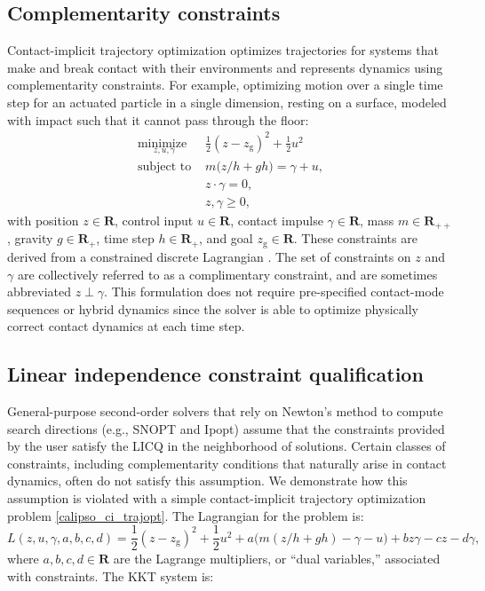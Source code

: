 \subsection{Complementarity constraints}
Contact-implicit trajectory optimization \cite{posa2014direct} optimizes trajectories for systems that make and break contact with their environments and represents dynamics using complementarity constraints. For example, optimizing motion over a single time step for an actuated particle in a single dimension, resting on a surface, modeled with impact such that it cannot pass through the floor:
\begin{equation}
	\begin{array}{ll}
		\underset{z, u, \gamma}{\mbox{minimize }} & \frac{1}{2}(z - z_{\mbox{g}})^2 + \frac{1}{2}u^2 \\
		\mbox{subject to } & m \big(z / h + g h \big) = \gamma + u, \\
		& z \cdot \gamma = 0, \\
		& z, \gamma \geq 0,
	\end{array} \label{calipso_ci_trajopt}
\end{equation}
with position $z\in \mathbf{R}$, control input $u \in \mathbf{R}$, contact impulse $\gamma \in \mathbf{R}$, mass $m \in \mathbf{R}_{++}$, gravity $g \in \mathbf{R}_{+}$, time step $h \in \mathbf{R}_+$, and goal $z_{\mbox{g}} \in \mathbf{R}$. These constraints are derived from a constrained discrete Lagrangian \cite{manchester2020variational}. The set of constraints on $z$ and $\gamma$ are collectively referred to as a complimentary constraint, and are sometimes abbreviated $z \perp \gamma$. This formulation does not require pre-specified contact-mode sequences or hybrid dynamics since the solver is able to optimize physically correct contact dynamics at each time step.

\subsection{Linear independence constraint qualification}
General-purpose second-order solvers that rely on Newton's method to compute search directions (e.g., SNOPT and Ipopt) assume that the constraints provided by the user satisfy the LICQ in the neighborhood of solutions. Certain classes of constraints, including complementarity conditions that naturally arise in contact dynamics, often do not satisfy this assumption. 
We demonstrate how this assumption is violated with a simple contact-implicit trajectory optimization problem \eqref{calipso_ci_trajopt}. The Lagrangian for the problem is: 
\begin{equation}
	L(z, u, \gamma, a, b, c, d) = \frac{1}{2}(z - z_{\mbox{g}})^2 + \frac{1}{2}u^2 + a \big( m (z / h + g h ) - \gamma - u \big) + b z \gamma - c z - d \gamma,
\end{equation}
where $a, b, c, d \in \mathbf{R}$ are the Lagrange multipliers, or ``dual variables,'' associated with constraints. The KKT system is:

